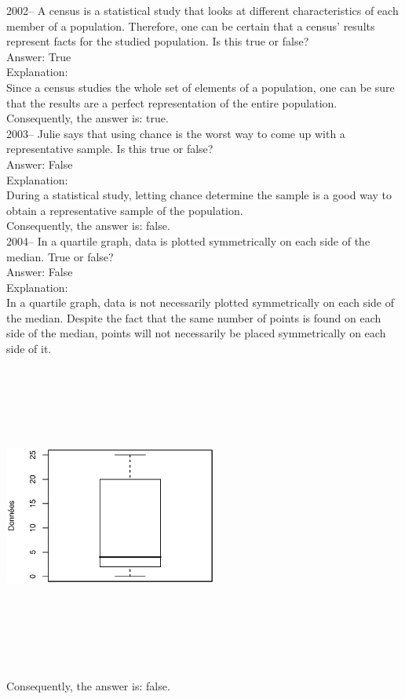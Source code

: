 \documentclass[letterpaper, 12pt]{article}
\begin{document}

2002-- A census is a statistical study that looks at different characteristics of each member of a population. Therefore, one can be certain that a census' results represent facts for the studied population. Is this true or false?\\

Answer: True\\

Explanation:\\
Since a census studies the whole set of elements of a population, one can be sure that the results are a perfect representation of the entire population.\\
Consequently, the answer is: true.\\

2003-- Julie says that using chance is the worst way to come up with a representative sample. Is this true or false? \\

Answer: False\\

Explanation:\\
During a statistical study, letting chance determine the sample is a good way to obtain a representative sample of the population. \\
Consequently, the answer is: false.\\


2004-- In a quartile graph, data is plotted symmetrically on each side of the median. True or false?\\

Answer: False\\

Explanation:\\
In a quartile graph, data is not necessarily plotted symmetrically
on each side of the median. Despite the fact that the same number of
points is found on each side of the median, points will not
necessarily be placed symmetrically on each side of it.
\begin{center}
 \includegraphics[width=7cm,height=10cm,angle=-90]{G2004.eps}
\end{center}
Consequently, the answer is: false.\\
\end{document}
